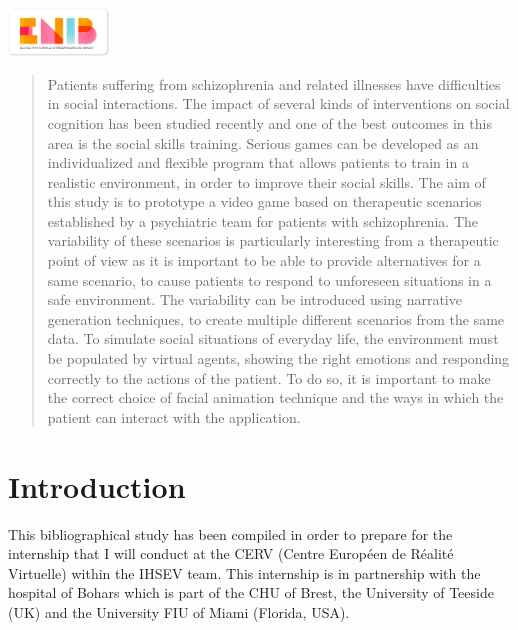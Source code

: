 \documentclass[11pt]{article}
\begin{document}
\begin{titlepage}
\begin{center}
\vfill


\begin{flushleft}
\includegraphics[width=0.2\textwidth]{./logos/enib}
\end{flushleft}
\end{center}
\end{titlepage}


\begin{abstract}
Patients suffering from schizophrenia and related illnesses have difficulties in social interactions. The impact of several kinds of interventions on social cognition has been studied recently and one of the best outcomes in this area is the social skills training. Serious games can be developed as an individualized and flexible program that allows patients to train in a realistic environment, in order to improve their social skills. The aim of this study is to prototype a video game based on therapeutic scenarios established by a psychiatric team for patients with schizophrenia. The variability of these scenarios is particularly interesting from a therapeutic point of view as it is important to be able to provide alternatives for a same scenario, to cause patients to respond to unforeseen situations in a safe environment. The variability can be introduced using narrative generation techniques, to create multiple different scenarios from the same data. To simulate social situations of everyday life, the environment must be populated by virtual agents, showing the right emotions and responding correctly to the actions of the patient. To do so, it is important to make the correct choice of facial animation technique and the ways in which the patient can interact with the application. \\[4ex]
\end{abstract}

\tableofcontents
\setcounter{page}{1} 
\newpage


\section{Introduction}
This bibliographical study has been compiled in order to prepare for the internship that I will conduct at the CERV (Centre Europ\'{e}en de Réalit\'{e} Virtuelle) within the IHSEV team. This internship is in partnership with the hospital of Bohars which is part of the CHU of Brest, the University of Teeside (UK) and the University FIU of Miami (Florida, USA). \\  
\end{document}
